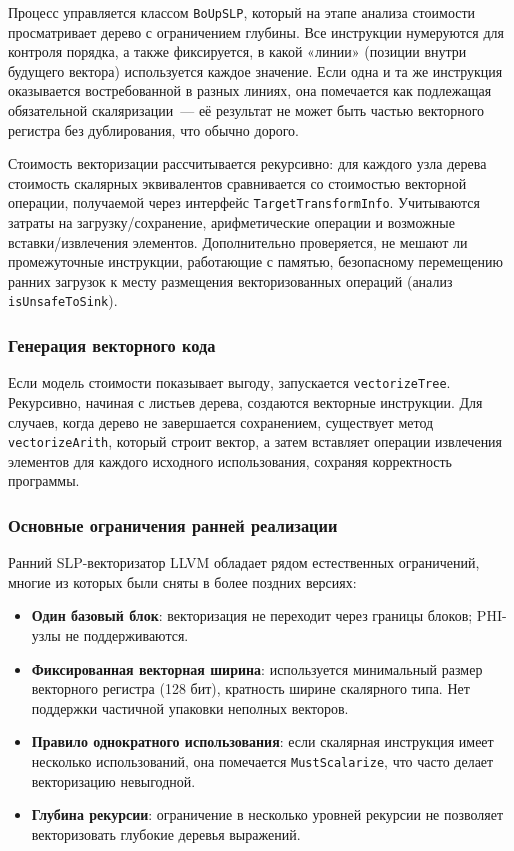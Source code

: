 Процесс управляется классом \texttt{BoUpSLP}, который на этапе анализа стоимости просматривает дерево с ограничением глубины. 
Все инструкции нумеруются для контроля порядка, а также фиксируется, в какой «линии» (позиции внутри будущего вектора) 
используется каждое значение. 
Если одна и та же инструкция оказывается востребованной в разных линиях, она помечается как
подлежащая обязательной скаляризации~--- её результат не может быть частью векторного регистра без дублирования, что обычно дорого.

Стоимость векторизации рассчитывается рекурсивно: для каждого узла дерева стоимость скалярных эквивалентов сравнивается 
со стоимостью векторной операции, получаемой через интерфейс \texttt{TargetTransformInfo}.
Учитываются затраты на загрузку/сохранение, арифметические операции и возможные вставки/извлечения элементов.
Дополнительно проверяется, не мешают ли промежуточные инструкции, работающие с памятью, безопасному перемещению ранних загрузок
к месту размещения векторизованных операций (анализ \texttt{isUnsafeToSink}).

\subsubsection{Генерация векторного кода}

Если модель стоимости показывает выгоду, запускается \texttt{vectorizeTree}. 
Рекурсивно, начиная с листьев дерева, создаются векторные инструкции.
Для случаев, когда дерево не завершается сохранением,
существует метод \texttt{vectorizeArith}, который строит вектор, 
а затем вставляет операции извлечения элементов для каждого исходного использования, сохраняя корректность программы.

\subsubsection{Основные ограничения ранней реализации}

Ранний SLP-векторизатор LLVM обладает рядом естественных ограничений, многие из которых были сняты в более поздних версиях:
\begin{itemize}
    \item \textbf{Один базовый блок}: векторизация не переходит через границы блоков; PHI-узлы не поддерживаются.
    \item \textbf{Фиксированная векторная ширина}: используется минимальный размер векторного регистра (128 бит), кратность ширине скалярного типа. Нет поддержки частичной упаковки неполных векторов.
    \item \textbf{Правило однократного использования}: если скалярная инструкция имеет несколько использований, она помечается \texttt{MustScalarize}, что часто делает векторизацию невыгодной.
    \item \textbf{Глубина рекурсии}: ограничение в несколько уровней рекурсии не позволяет векторизовать глубокие деревья выражений.
\end{itemize}

